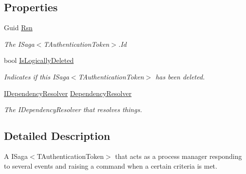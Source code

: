 \subsection*{Properties}
\begin{DoxyCompactItemize}
\item 
Guid \hyperlink{classCqrs_1_1Akka_1_1Tests_1_1Unit_1_1Sagas_1_1ConversationReportProcessManager_a86603fe9e9fa5e9b009064ea5ea6873a_a86603fe9e9fa5e9b009064ea5ea6873a}{Rsn}
\begin{DoxyCompactList}\small\item\em The I\+Saga$<$\+T\+Authentication\+Token$>$.\+Id \end{DoxyCompactList}\item 
bool \hyperlink{classCqrs_1_1Akka_1_1Tests_1_1Unit_1_1Sagas_1_1ConversationReportProcessManager_a567d02405fc3a52b33d2fe2c3a98b8a3_a567d02405fc3a52b33d2fe2c3a98b8a3}{Is\+Logically\+Deleted}
\begin{DoxyCompactList}\small\item\em Indicates if this I\+Saga$<$\+T\+Authentication\+Token$>$ has been deleted. \end{DoxyCompactList}\item 
\hyperlink{interfaceCqrs_1_1Configuration_1_1IDependencyResolver}{I\+Dependency\+Resolver} \hyperlink{classCqrs_1_1Akka_1_1Tests_1_1Unit_1_1Sagas_1_1ConversationReportProcessManager_a6ddc3cab5bedf62389eaa4c769441aa8_a6ddc3cab5bedf62389eaa4c769441aa8}{Dependency\+Resolver}
\begin{DoxyCompactList}\small\item\em The I\+Dependency\+Resolver that resolves things. \end{DoxyCompactList}\end{DoxyCompactItemize}


\subsection{Detailed Description}
A I\+Saga$<$\+T\+Authentication\+Token$>$ that acts as a process manager responding to several events and raising a command when a certain criteria is met. 



